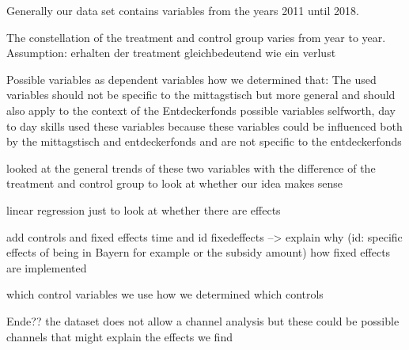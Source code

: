 \documentclass[12pt, a4paper]{article}\usepackage[]{graphicx}\usepackage[]{color}
\begin{document}
Generally our data set contains variables from the years 2011 until 2018. 

The constellation of the treatment and control group varies from year to year. 
Assumption: erhalten der treatment gleichbedeutend wie ein verlust

Possible variables as dependent variables
how we determined that:
The used variables should not be specific to the mittagstisch but more general and should also apply to the context of the Entdeckerfonds
possible variables selfworth, day to day skills
used these variables because these variables could be influenced both by the mittagstisch and entdeckerfonds and are not specific to the entdeckerfonds

looked at the general trends of these two variables with the difference of the treatment and control group to look at whether our idea makes sense

linear regression just to look at whether there are effects

add controls and fixed effects time and id fixedeffects --> explain why (id: specific effects of being in Bayern for example or the subsidy amount)
how fixed effects are implemented

which control variables we use
how we determined which controls





Ende??
the dataset does not allow a channel analysis but these could be possible channels that might explain the effects we find
\end{document}
